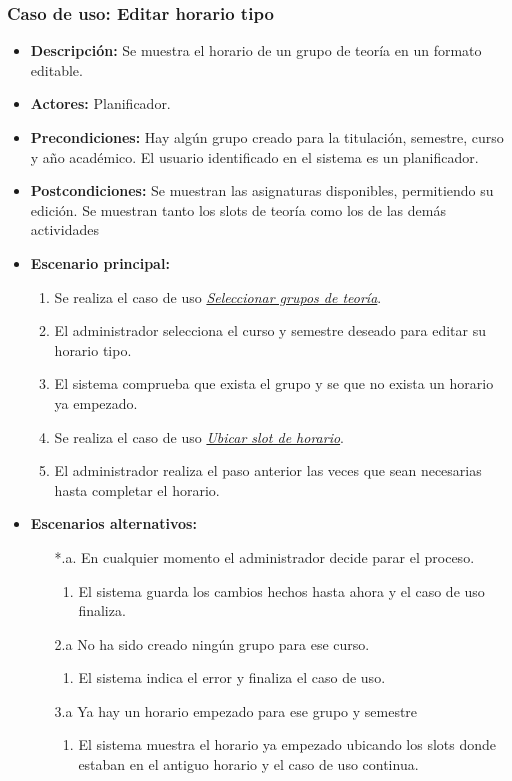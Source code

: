 \subsubsection*{Caso de uso: Editar horario tipo}
\begin{itemize}
\item{\bf Descripción:} Se muestra el horario de un grupo de teoría en un formato editable.
\item{\bf Actores:} Planificador.
\item{\bf Precondiciones:} Hay algún grupo creado para la titulación, semestre, curso y año académico. El usuario identificado en el sistema es un planificador.
\item{\bf Postcondiciones:} Se muestran las asignaturas disponibles, permitiendo su edición. Se muestran tanto los slots de teoría como los de las demás actividades
\item{\bf Escenario principal:}
	\begin{enumerate}
	\item Se realiza el caso de uso {\em \hyperref[select_grupo]{Seleccionar grupos de teoría}}.
	\item El administrador selecciona el curso y semestre deseado para editar su horario tipo.
	\item El sistema comprueba que exista el grupo y se que no exista un horario ya empezado.
	\item Se realiza el caso de uso {\em \hyperref[guardar_slot]{Ubicar slot de horario}}.
	\item El administrador realiza el paso anterior las veces que sean necesarias hasta completar el horario.
	\end{enumerate}
\item{\bf Escenarios alternativos:}
	\begin{itemize}
		\item[*.a.] En cualquier momento el administrador decide parar el proceso.
		\begin{enumerate}
			\item El sistema guarda los cambios hechos hasta ahora y el caso de uso finaliza.
		\end{enumerate}
		\item[2.a] No ha sido creado ningún grupo para ese curso.
		\begin{enumerate}
			\item El sistema indica el error y finaliza el caso de uso.
		\end{enumerate}
		\item[3.a] Ya hay un horario empezado para ese grupo y semestre
		\begin{enumerate}
			\item El sistema muestra el horario ya empezado ubicando los slots donde estaban en el antiguo horario y el caso de uso continua.
		\end{enumerate}
	\end{itemize}
\end{itemize}



